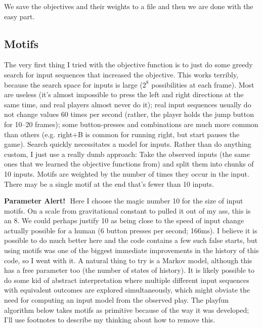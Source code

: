 \documentclass[twocolumn]{article}
\newcommand\parameteralert[1]{
  {\bf Parameter Alert!}\,\, #1
}
\begin{document}

We save the objectives and their weights to a file and then we are
done with the easy part.

\subsection{Motifs} \label{sec:motifs}

The very first thing I tried with the objective function is to just do
some greedy search for input sequences that increased the objective.
This works terribly, because the search space for inputs is large
($2^8$ possibilities at each frame). Most are useless (it's almost
impossible to press the left and right directions at the same time,
and real players almost never do it); real input sequences usually do
not change values 60 times per second (rather, the player holds the
jump button for 10--20 frames); some button-presses and combinations
are much more common than others (e.g. right+B is common for running
right, but start pauses the game). Search quickly necessitates a model
for inputs. Rather than do anything custom, I just use a really dumb
approach: Take the observed inputs (the same ones that we learned the
objective functions from) and split them into chunks of 10 inputs.
Motifs are weighted by the number of times they occur in the input.
There may be a single motif at the end that's fewer than 10 inputs.

\parameteralert{Here I choose the magic number 10 for the size of input
  motifs. On a scale from gravitational constant to pulled it out of
  my ass, this is an 8. We could perhaps justify 10 as being close to
  the speed of input change actually possible for a human (6 button
  presses per second; 166ms). I believe it is possible to do much
  better here and the code contains a few such false starts, but using
  motifs was one of the biggest immediate improvements in the history
  of this code, so I went with it. A natural thing to try is a Markov
  model, although this has a free parameter too (the number of states
  of history). It is likely possible to do some kid of abstract
  interpretation where multiple different input sequences with
  equivalent outcomes are explored simultaneously, which might obviate
  the need for computing an input model from the observed play. The
  playfun algorithm below takes motifs as primitive because of the way
  it was developed; I'll use footnotes to describe my thinking about
  how to remove this.}
\end{document}
